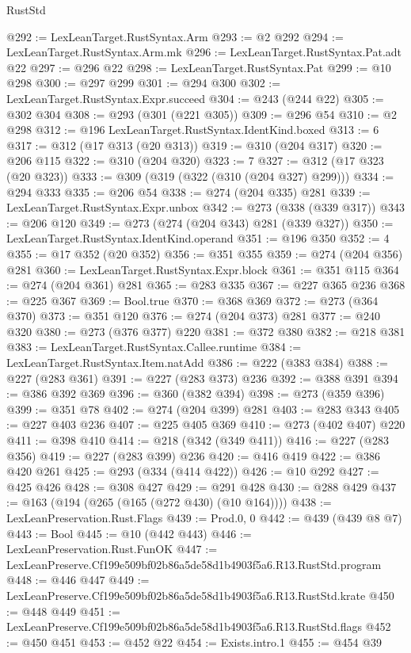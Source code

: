 \begin{lexlean}{RustStd}
\begin{coremodule}
@292 := LexLeanTarget.RustSyntax.Arm
@293 := @2 @292
@294 := LexLeanTarget.RustSyntax.Arm.mk
@296 := LexLeanTarget.RustSyntax.Pat.adt @22
@297 := @296 @22
@298 := LexLeanTarget.RustSyntax.Pat
@299 := @10 @298
@300 := @297 @299
@301 := @294 @300
@302 := LexLeanTarget.RustSyntax.Expr.succeed
@304 := @243 (@244 @22)
@305 := @302 @304
@308 := @293 (@301 (@221 @305))
@309 := @296 @54
@310 := @2 @298
@312 := @196 LexLeanTarget.RustSyntax.IdentKind.boxed
@313 := 6
@317 := @312 (@17 @313 (@20 @313))
@319 := @310 (@204 @317)
@320 := @206 @115
@322 := @310 (@204 @320)
@323 := 7
@327 := @312 (@17 @323 (@20 @323))
@333 := @309 (@319 (@322 (@310 (@204 @327) @299)))
@334 := @294 @333
@335 := @206 @54
@338 := @274 (@204 @335) @281
@339 := LexLeanTarget.RustSyntax.Expr.unbox
@342 := @273 (@338 (@339 @317))
@343 := @206 @120
@349 := @273 (@274 (@204 @343) @281 (@339 @327))
@350 := LexLeanTarget.RustSyntax.IdentKind.operand
@351 := @196 @350
@352 := 4
@355 := @17 @352 (@20 @352)
@356 := @351 @355
@359 := @274 (@204 @356) @281
@360 := LexLeanTarget.RustSyntax.Expr.block
@361 := @351 @115
@364 := @274 (@204 @361) @281
@365 := @283 @335
@367 := @227 @365 @236
@368 := @225 @367
@369 := Bool.true
@370 := @368 @369
@372 := @273 (@364 @370)
@373 := @351 @120
@376 := @274 (@204 @373) @281
@377 := @240 @320
@380 := @273 (@376 @377) @220
@381 := @372 @380
@382 := @218 @381
@383 := LexLeanTarget.RustSyntax.Callee.runtime
@384 := LexLeanTarget.RustSyntax.Item.natAdd
@386 := @222 (@383 @384)
@388 := @227 (@283 @361)
@391 := @227 (@283 @373) @236
@392 := @388 @391
@394 := @386 @392 @369
@396 := @360 (@382 @394)
@398 := @273 (@359 @396)
@399 := @351 @78
@402 := @274 (@204 @399) @281
@403 := @283 @343
@405 := @227 @403 @236
@407 := @225 @405 @369
@410 := @273 (@402 @407) @220
@411 := @398 @410
@414 := @218 (@342 (@349 @411))
@416 := @227 (@283 @356)
@419 := @227 (@283 @399) @236
@420 := @416 @419
@422 := @386 @420 @261
@425 := @293 (@334 (@414 @422))
@426 := @10 @292
@427 := @425 @426
@428 := @308 @427
@429 := @291 @428
@430 := @288 @429
@437 := @163 (@194 (@265 (@165 (@272 @430) (@10 @164))))
@438 := LexLeanPreservation.Rust.Flags
@439 := Prod.{0, 0}
@442 := @439 (@439 @8 @7)
@443 := Bool
@445 := @10 (@442 @443)
@446 := LexLeanPreservation.Rust.FunOK
@447 := LexLeanPreserve.Cf199e509bf02b86a5de58d1b4903f5a6.R13.RustStd.program
@448 := @446 @447
@449 := LexLeanPreserve.Cf199e509bf02b86a5de58d1b4903f5a6.R13.RustStd.krate
@450 := @448 @449
@451 := LexLeanPreserve.Cf199e509bf02b86a5de58d1b4903f5a6.R13.RustStd.flags
@452 := @450 @451
@453 := @452 @22
@454 := Exists.intro.{1}
@455 := @454 @39

\end{coremodule}
\end{lexlean}
